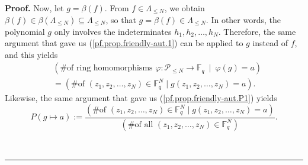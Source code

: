 \documentclass[numbers=enddot,12pt,final,onecolumn,notitlepage]{scrartcl}%
\theoremstyle{definition}
\newenvironment{proof}[1][Proof]{\noindent\textbf{#1.} }{\ \rule{0.5em}{0.5em}}
\newenvironment{verlong}{}{}
\newcommand{\Fq}{\mathbb{F}_q}
\renewcommand{\leq}{\leqslant}
\theoremstyle{plainsl}
\begin{document}
\begin{verlong}
\begin{proof}
Now, let $g=\beta\left(  f\right)  $. From $f\in\Lambda_{\leq N}$, we obtain
$\beta\left(  f\right)  \in\beta\left(  \Lambda_{\leq N}\right)
\subseteq\Lambda_{\leq N}$, so that $g=\beta\left(  f\right)  \in\Lambda_{\leq
N}$. In other words, the polynomial $g$ only involves the indeterminates
$h_{1},h_{2},\ldots,h_{N}$. Therefore, the same argument that gave us
(\ref{pf.prop.friendly-aut.1}) can be applied to $g$ instead of $f$, and this
yields%
\begin{align}
& \left(  \text{\# of ring homomorphisms }\varphi:\mathcal{P}_{\leq
N}\rightarrow\Fq\ \mid\ \varphi\left(  g\right)  =a\right)
\nonumber\\
& =\left(  \text{\# of }\left(  z_{1},z_{2},\ldots,z_{N}\right)  \in
\Fq^{N}\mid g\left(  z_{1},z_{2},\ldots,z_{N}\right)  =a\right)
.\label{pf.prop.friendly-aut.2}%
\end{align}
Likewise, the same argument that gave us (\ref{pf.prop.friendly-aut.P1})
yields%
\begin{equation}
P\left(  g\mapsto a\right)  :=\dfrac{\left(  \text{\# of }\left(  z_{1}%
,z_{2},\ldots,z_{N}\right)  \in\Fq^{N}\mid g\left(  z_{1}%
,z_{2},\ldots,z_{N}\right)  =a\right)  }{\left(  \text{\# of all }\left(
z_{1},z_{2},\ldots,z_{N}\right)  \in\Fq^{N}\right)  }%
.\label{pf.prop.friendly-aut.P2}%
\end{equation}



\end{proof}
\end{verlong}
\end{document}
